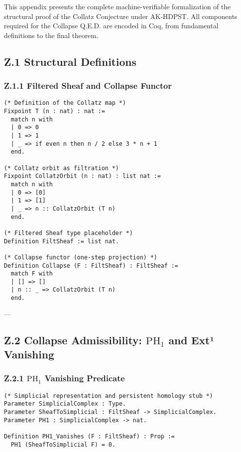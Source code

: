 \documentclass[11pt]{article}
\begin{document}
This appendix presents the complete machine-verifiable formalization of the structural proof of the Collatz Conjecture under AK-HDPST. All components required for the Collapse Q.E.D. are encoded in Coq, from fundamental definitions to the final theorem.

\subsection*{Z.1 Structural Definitions}

\subsubsection*{Z.1.1 Filtered Sheaf and Collapse Functor}

\begin{lstlisting}[language=Coq]
(* Definition of the Collatz map *)
Fixpoint T (n : nat) : nat :=
  match n with
  | 0 => 0
  | 1 => 1
  | _ => if even n then n / 2 else 3 * n + 1
  end.

(* Collatz orbit as filtration *)
Fixpoint CollatzOrbit (n : nat) : list nat :=
  match n with
  | 0 => [0]
  | 1 => [1]
  | _ => n :: CollatzOrbit (T n)
  end.

(* Filtered Sheaf type placeholder *)
Definition FiltSheaf := list nat.

(* Collapse functor (one-step projection) *)
Definition Collapse (F : FiltSheaf) : FiltSheaf :=
  match F with
  | [] => []
  | n :: _ => CollatzOrbit (T n)
  end.
\end{lstlisting}

---

\subsection*{Z.2 Collapse Admissibility: \( \mathrm{PH}_1 \) and Ext¹ Vanishing}

\subsubsection*{Z.2.1 \( \mathrm{PH}_1 \) Vanishing Predicate}

\begin{lstlisting}[language=Coq]
(* Simplicial representation and persistent homology stub *)
Parameter SimplicialComplex : Type.
Parameter SheafToSimplicial : FiltSheaf -> SimplicialComplex.
Parameter PH1 : SimplicialComplex -> nat.

Definition PH1_Vanishes (F : FiltSheaf) : Prop :=
  PH1 (SheafToSimplicial F) = 0.
\end{lstlisting}
\end{document}
